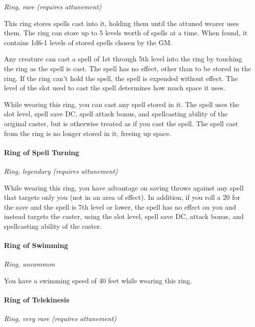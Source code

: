 \documentclass[
]{article}
\begin{document}
\emph{Ring, rare (requires attunement)}

This ring stores spells cast into it, holding them until the attuned
wearer uses them. The ring can store up to 5 levels worth of spells at a
time. When found, it contains 1d6-1 levels of stored spells chosen by
the GM.

Any creature can cast a spell of 1st through 5th level into the ring by
touching the ring as the spell is cast. The spell has no effect, other
than to be stored in the ring. If the ring can't hold the spell, the
spell is expended without effect. The level of the slot used to cast the
spell determines how much space it uses.

While wearing this ring, you can cast any spell stored in it. The spell
uses the slot level, spell save DC, spell attack bonus, and spellcasting
ability of the original caster, but is otherwise treated as if you cast
the spell. The spell cast from the ring is no longer stored in it,
freeing up space.

\hypertarget{ring-of-spell-turning}{%
\paragraph{Ring of Spell Turning}\label{ring-of-spell-turning}}

\emph{Ring, legendary (requires attunement)}

While wearing this ring, you have advantage on saving throws against any
spell that targets only you (not in an area of effect). In addition, if
you roll a 20 for the save and the spell is 7th level or lower, the
spell has no effect on you and instead targets the caster, using the
slot level, spell save DC, attack bonus, and spellcasting ability of the
caster.

\hypertarget{ring-of-swimming}{%
\paragraph{Ring of Swimming}\label{ring-of-swimming}}

\emph{Ring, uncommon}

You have a swimming speed of 40 feet while wearing this ring.

\hypertarget{ring-of-telekinesis}{%
\paragraph{Ring of Telekinesis}\label{ring-of-telekinesis}}

\emph{Ring, very rare (requires attunement)}
\end{document}
